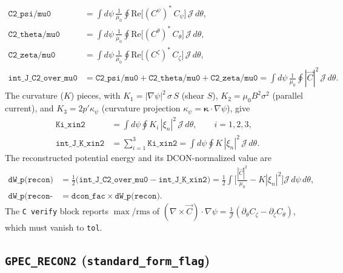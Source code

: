 \documentclass[10pt,a4paper]{article}
\numberwithin{equation}{section}
\begin{document}
\begin{align}
\texttt{C2\_psi/mu0}
&=\int\! d\psi\,\frac{1}{\mu_0}\oint
   \mathrm{Re}\!\big[(C^\psi)^*\,C_\psi\big]\,\mathcal J\,d\theta,\\
\texttt{C2\_theta/mu0}
&=\int\! d\psi\,\frac{1}{\mu_0}\oint
   \mathrm{Re}\!\big[(C^\theta)^*\,C_\theta\big]\,\mathcal J\,d\theta,\\
\texttt{C2\_zeta/mu0}
&=\int\! d\psi\,\frac{1}{\mu_0}\oint
   \mathrm{Re}\!\big[(C^\zeta)^*\,C_\zeta\big]\,\mathcal J\,d\theta,\\
\texttt{int\_J\_C2\_over\_mu0}
&=\texttt{C2\_psi/mu0}+\texttt{C2\_theta/mu0}+\texttt{C2\_zeta/mu0}
 =\int\! d\psi\,\frac{1}{\mu_0}\oint |\vec C|^2\,\mathcal J\,d\theta.
\end{align}
The curvature ($K$) pieces, with
$K_1=|\nabla\psi|^2\,\sigma\,S$ (shear $S$),
$K_2=\mu_0 B^2\sigma^2$ (parallel current), and
$K_3=2p'\kappa_\psi$ (curvature projection
\(\kappa_\psi=\boldsymbol\kappa\cdot\nabla\psi\)), give
\begin{align}
\texttt{Ki\_xin2}
&=\int\! d\psi\oint K_i\,|\xi_n|^2\,\mathcal J\,d\theta,
\qquad i=1,2,3,\\
\texttt{int\_J\_K\_xin2}
&=\sum_{i=1}^{3}\texttt{Ki\_xin2}
 =\int\! d\psi\oint K\,|\xi_n|^2\,\mathcal J\,d\theta.
\end{align}
The reconstructed potential energy and its DCON-normalized value are
\begin{align}
\texttt{dW\_p(recon)}
&=\tfrac12\bigl(\texttt{int\_J\_C2\_over\_mu0}-\texttt{int\_J\_K\_xin2}\bigr)
 =\tfrac12\!\int\!\Big[\tfrac{|\vec C|^2}{\mu_0}-K|\xi_n|^2\Big]
   \mathcal J\,d\psi\,d\theta,\\
\texttt{dW\_p(recon-normalize)}
&=\texttt{dcon\_fac}\times\texttt{dW\_p(recon)} .
\end{align}
The \texttt{C verify} block reports $\max$/$\mathrm{rms}$ of
$(\nabla\times\vec C)\cdot\nabla\psi=\tfrac1{\mathcal J}
(\partial_\theta C_\zeta-\partial_\zeta C_\theta)$, which must vanish to
\texttt{tol}.

\subsection{\texttt{GPEC\_RECON2} (\texttt{standard\_form\_flag})}
\end{document}
